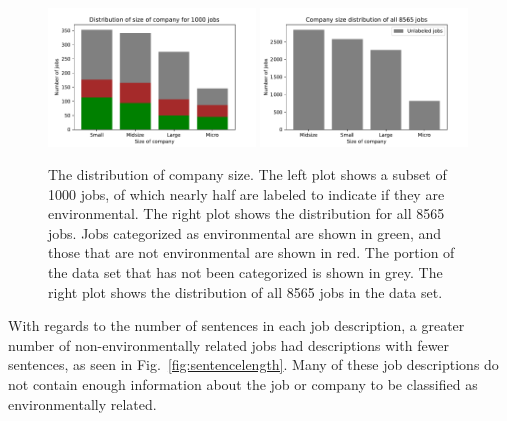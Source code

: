 \begin{figure}[htbp]
  \centering
    \includegraphics[width=0.49\textwidth]{figures/CompanySize.pdf}
    \includegraphics[width=0.49\textwidth]{figures/CompanySizeAll.pdf}

    \caption[The distribution of company size in the jobs data set]{
    	The distribution of company size.
    	The left plot shows a subset of 1000 jobs, of which nearly half are labeled to indicate if they are environmental. The right plot shows the distribution for all 8565 jobs.
        Jobs categorized as environmental are shown in green, and those that are not environmental are shown in red.
        The portion of the data set that has not been categorized is shown in grey. The right plot shows the distribution
        of all 8565 jobs in the data set.
    }
\label{fig:companysize}
\end{figure}



With regards to the number of sentences in each job description, a greater number of non-environmentally related jobs had descriptions with fewer sentences, as seen in Fig.~\ref{fig:sentencelength}. Many of these job descriptions do not contain enough information about the job or company to be classified as environmentally related.


